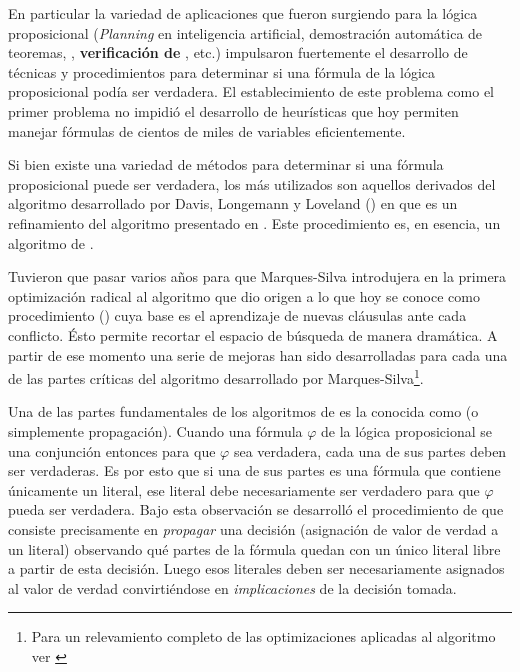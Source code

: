 En particular la variedad de aplicaciones que fueron surgiendo para la lógica
proposicional (\emph{Planning} en inteligencia artificial, demostración
automática de teoremas, \textbf{\mc}, \textbf{verificación de \soft}, etc.)
impulsaron fuertemente el desarrollo de técnicas y procedimientos para
determinar si una fórmula de la lógica proposicional podía ser verdadera. El
establecimiento de este problema como el primer problema \npc
\cite{Cook:1971:CTP:800157.805047} no impidió el desarrollo de heurísticas que
hoy permiten manejar fórmulas de cientos de miles de variables eficientemente.

Si bien existe una variedad de métodos para determinar si una fórmula
proposicional puede ser verdadera, los más utilizados son aquellos derivados
del algoritmo desarrollado por Davis, Longemann y Loveland (\dpll) en
\cite{Davis:1962:MPT:368273.368557} que es un refinamiento del algoritmo
presentado en \cite{Davis:1960:CPQ:321033.321034}. Este procedimiento es, en
esencia, un algoritmo de \bt.

Tuvieron que pasar varios años para que Marques-Silva introdujera en \cite
{marques-silva:iccad96} la primera optimización radical al algoritmo \dpll que
dio origen a lo que hoy se conoce como procedimiento \cdcl (\CDCL) cuya base
es el aprendizaje de nuevas cláusulas ante cada conflicto. Ésto permite
recortar el espacio de búsqueda de manera dramática. A partir de ese momento
una serie de mejoras han sido desarrolladas para cada una de las partes
críticas del algoritmo desarrollado por Marques-Silva\footnote{Para un
relevamiento completo de las optimizaciones aplicadas al algoritmo \CDCL ver
\cite{manthey:mathesis}}.

Una de las partes fundamentales de los algoritmos de \ssolving es la conocida
como \bcp (o simplemente propagación). Cuando una fórmula $\varphi$ de la
lógica proposicional se una conjunción entonces para que $\varphi$ sea
verdadera, cada una de sus partes deben ser verdaderas. Es por esto que si una
de sus partes es una fórmula que contiene únicamente un literal, ese literal
debe necesariamente ser verdadero para que $\varphi$ pueda ser verdadera. Bajo
esta observación se desarrolló el procedimiento de \BCP que consiste
precisamente en \emph{propagar} una decisión (asignación de valor de verdad a
un literal) observando qué partes de la fórmula quedan con un único literal
libre a partir de esta decisión. Luego esos literales deben ser necesariamente
asignados al valor de verdad \T convirtiéndose en \emph{implicaciones} de la
decisión tomada.

